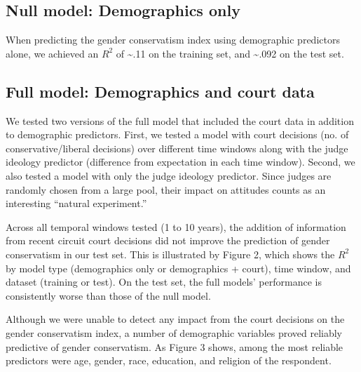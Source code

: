 \documentclass{article}
\begin{document}
\subsection{Null model: Demographics
only}\label{null-model-demographics-only}

When predicting the gender conservatism index using demographic
predictors alone, we achieved an \(R^2\) of
\textasciitilde{}.11 on the training set, and \textasciitilde{}.092 on
the test set.

\subsection{Full model: Demographics and court
data}\label{full-model-demographics-and-court-data}

We tested two versions of the full model that included the court data in
addition to demographic predictors. First, we tested a model with court
decisions (no. of conservative/liberal decisions) over different time
windows along with the judge ideology predictor (difference from
expectation in each time window). Second, we also tested a model with
only the judge ideology predictor. Since judges are randomly chosen from
a large pool, their impact on attitudes counts as an interesting
``natural experiment.''

Across all temporal windows tested (1 to 10 years), the addition of
information from recent circuit court decisions did not improve the
prediction of gender conservatism in our test set. This is illustrated
by Figure 2, which shows the \(R^2\) by model type
(demographics only or demographics + court), time window, and dataset
(training or test). On the test set, the full models' performance is
consistently worse than those of the null model.

Although we were unable to detect any impact from the court decisions on
the gender conservatism index, a number of demographic variables proved
reliably predictive of gender conservatism. As Figure 3 shows, among the
most reliable predictors were age, gender, race, education, and religion
of the respondent.
\end{document}
